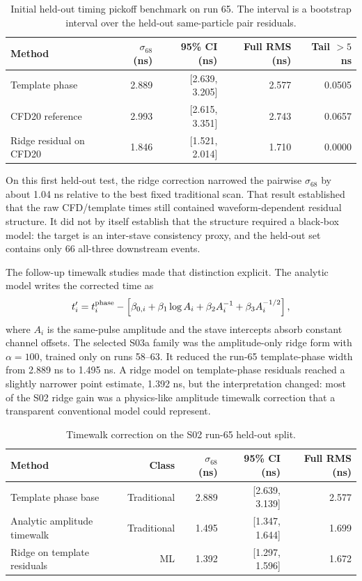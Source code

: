 \begin{table}[H]
\centering
\caption{Initial held-out timing pickoff benchmark on run 65.  The interval is a
bootstrap interval over the held-out same-particle pair residuals.}
\begin{tabular}{lrrrr}
\toprule
Method & \(\sigma_{68}\) (ns) & 95\% CI (ns) & Full RMS (ns) & Tail \(>5\) ns \\
\midrule
Template phase & 2.889 & [2.639, 3.205] & 2.577 & 0.0505 \\
CFD20 reference & 2.993 & [2.615, 3.351] & 2.743 & 0.0657 \\
Ridge residual on CFD20 & 1.846 & [1.521, 2.014] & 1.710 & 0.0000 \\
\bottomrule
\end{tabular}
\end{table}

On this first held-out test, the ridge correction narrowed the pairwise
\(\sigma_{68}\) by about 1.04 ns relative to the best fixed traditional scan.
That result established that the raw CFD/template times still contained
waveform-dependent residual structure.  It did not by itself establish that the
structure required a black-box model: the target is an inter-stave consistency
proxy, and the held-out set contains only 66 all-three downstream events.

The follow-up timewalk studies made that distinction explicit.  The analytic
model writes the corrected time as
\begin{equation}
  t'_i =
  t^{\rm phase}_i -
  \left[
    \beta_{0,i} + \beta_{1}\log A_i
    + \beta_{2} A_i^{-1}
    + \beta_{3} A_i^{-1/2}
  \right],
\end{equation}
where \(A_i\) is the same-pulse amplitude and the stave intercepts absorb
constant channel offsets.  The selected S03a family was the amplitude-only ridge
form with \(\alpha=100\), trained only on runs 58--63.  It reduced the run-65
template-phase width from 2.889 ns to 1.495 ns.  A ridge model on template-phase
residuals reached a slightly narrower point estimate, 1.392 ns, but the
interpretation changed: most of the S02 ridge gain was a physics-like amplitude
timewalk correction that a transparent conventional model could represent.

\begin{table}[H]
\centering
\caption{Timewalk correction on the S02 run-65 held-out split.}
\begin{tabular}{lrrrr}
\toprule
Method & Class & \(\sigma_{68}\) (ns) & 95\% CI (ns) & Full RMS (ns) \\
\midrule
Template phase base & Traditional & 2.889 & [2.639, 3.139] & 2.577 \\
Analytic amplitude timewalk & Traditional & 1.495 & [1.347, 1.644] & 1.699 \\
Ridge on template residuals & ML & 1.392 & [1.297, 1.596] & 1.672 \\
\bottomrule
\end{tabular}
\end{table}

